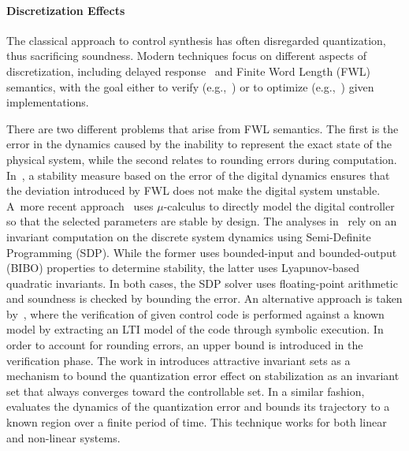 \documentclass[runningheads,a4paper]{llncs}
\begin{document}

\paragraph{Discretization Effects}

The classical approach to control synthesis has often disregarded
quantization, thus sacrificing soundness.  Modern techniques focus on
different aspects of discretization, including delayed
response~\cite{Duggirala2015} and Finite Word Length (FWL) semantics, with
the goal either to verify (e.g.,~\cite{daes20161}) or to optimize
(e.g.,~\cite{oudjida2014design}) given implementations.

There are two different problems that arise from FWL semantics.  The first
is the error in the dynamics caused by the inability to represent the exact
state of the physical system, while the second relates to rounding errors
during computation.  In~\cite{fialho1994stability}, a stability measure
based on the error of the digital dynamics ensures that the deviation
introduced by FWL does not make the digital system unstable.  A~more recent
approach~\cite{DBLP:journals/automatica/WuLCC09} uses $\mu$-calculus to
directly model the digital controller so that the selected parameters are
stable by design.  The analyses in~\cite{DBLP:conf/hybrid/RouxJG15,
DBLP:conf/hybrid/WangGRJF16} rely on an invariant computation on the
discrete system dynamics using Semi-Definite Programming (SDP).  While the
former uses bounded-input and bounded-output (BIBO) properties to determine
stability, the latter uses Lyapunov-based quadratic invariants.  In both
cases, the SDP solver uses floating-point arithmetic and soundness is
checked by bounding the error.  An alternative approach is taken
by~\cite{park2016scalable}, where the verification of given control code is
performed against a known model by extracting an LTI model of the code
through symbolic execution.  In order to account for rounding errors, an
upper bound is introduced in the verification phase.  The work in
\cite{picasso2003stabilization, picasso2002construction} introduces
attractive invariant sets as a mechanism to bound the quantization error
effect on stabilization as an invariant set that always converges toward the
controllable set.  In a similar fashion, \cite{liberzon2003hybrid} evaluates
the dynamics of the quantization error and bounds its trajectory to a known
region over a finite period of time.  This technique works for both linear
and non-linear systems.
\end{document}
